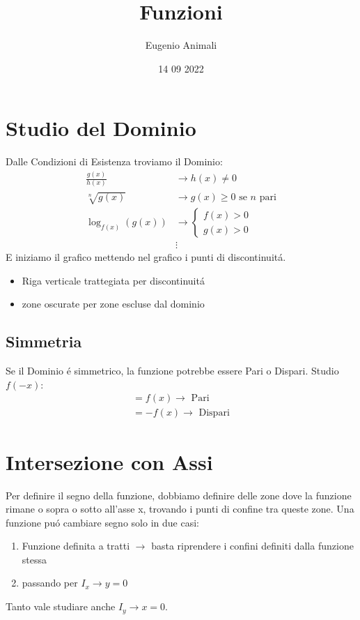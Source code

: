 \documentclass{article}
\title{Funzioni}
\author{Eugenio Animali}
\date{14 09 2022}
\begin{document}
\maketitle
\tableofcontents
\newpage
\section{Studio del Dominio}
Dalle Condizioni di Esistenza troviamo il Dominio:
\begin{align}
    \frac{g(x)}{h(x)}&\to h(x)\neq 0\\
    \sqrt[n]{g(x)}&\to g(x)\geq 0\text{ se $n$ pari}\\
    \log_{f(x)}(g(x))&\to \begin{cases}
        f(x)>0\\
        g(x)>0
    \end{cases}\\
    &\vdots
\end{align}
E iniziamo il grafico mettendo nel grafico i punti di discontinuitá.
\begin{itemize}
    \item Riga verticale trattegiata per discontinuitá
    \item zone oscurate per zone escluse dal dominio
\end{itemize}
\subsection{Simmetria}
Se il Dominio é simmetrico, la funzione potrebbe essere Pari o Dispari. Studio $f(-x)$:
\begin{gather*}
    =f(x)\to\text{ Pari}\\
    =-f(x)\to\text{ Dispari}
\end{gather*}
\section{Intersezione con Assi}
Per definire il segno della funzione, dobbiamo definire delle zone dove la funzione rimane o sopra o sotto all'asse x, trovando i punti di confine tra queste zone. Una funzione puó cambiare segno solo in due casi:
\begin{enumerate}
    \item Funzione definita a tratti $\to$ basta riprendere i confini definiti dalla funzione stessa
    \item passando per $I_x\to y=0$
\end{enumerate}
Tanto vale studiare anche $I_y\to x=0$.
\end{document}
